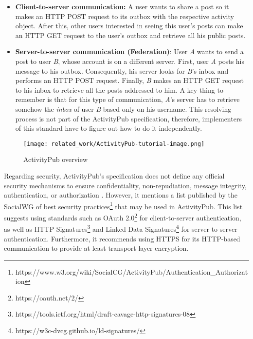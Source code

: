 \begin{itemize}
  \item \textbf{Client-to-server communication:} A user wants to share a post so it makes an HTTP POST request to its outbox with the respective activity object. After this, other users interested in seeing this user's posts can make an HTTP GET request to the user's outbox and retrieve all his public posts.
  \item \textbf{Server-to-server communication (Federation)}: User \emph{A} wants to send a post to user \emph{B}, whose account is on a different server. First, user \emph{A} posts his message to his outbox. Consequently, his server looks for \emph{B}'s inbox and performs an HTTP POST request. Finally, \emph{B} makes an HTTP GET request to his inbox to retrieve all the posts addressed to him. A key thing to remember is that for this type of communication, \emph{A}'s server has to retrieve somehow the \emph{inbox} of user \emph{B} based only on his username. This resolving process is not part of the ActivityPub specification, therefore,  implementers of this standard have to figure out how to do it independently. 
\end{itemize}
 

\begin{figure}[H]
  \centering
  \texttt{[image: related\_work/ActivityPub-tutorial-image.png]}
  \caption{ActivityPub overview \cite{lemmer-webber_tallon_guy_prodromou_2018}}
  \label{fig:ap_flow}
\end{figure}
\pagebreak

Regarding security, ActivityPub's specification does not define any official security mechanisms to ensure confidentiality, non-repudiation, message integrity, authentication, or authorization \cite{lemmer-webber_tallon_guy_prodromou_2018}. However, it mentions a list published by the SocialWG of best security practices\footnote{https://www.w3.org/wiki/SocialCG/ActivityPub/Authentication\_Authorization} that may be used in ActivityPub. This list suggests using standards such as OAuth 2.0\footnote{https://oauth.net/2/} for client-to-server authentication, as well as HTTP Signatures\footnote{https://tools.ietf.org/html/draft-cavage-http-signatures-08} and Linked Data Signatures\footnote{https://w3c-dvcg.github.io/ld-signatures/} for server-to-server authentication. Furthermore, it recommends using HTTPS for its HTTP-based communication to provide at least transport-layer encryption.


